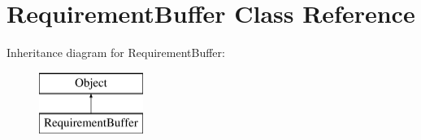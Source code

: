 \hypertarget{class_requirement_buffer}{\section{Requirement\-Buffer Class Reference}
\label{class_requirement_buffer}
}
Inheritance diagram for Requirement\-Buffer\-:\begin{figure}[H]
\begin{center}
\leavevmode
\includegraphics[height=2.000000cm]{class_requirement_buffer}
\end{center}
\end{figure}
